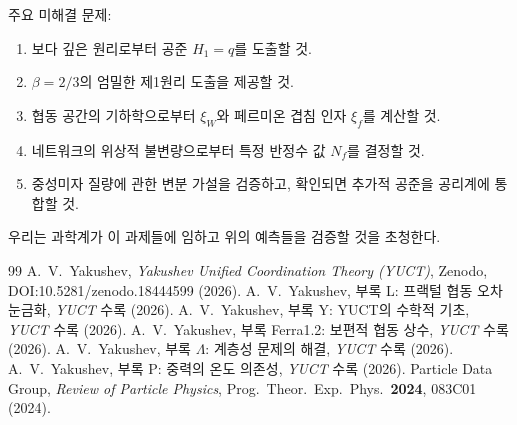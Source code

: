 \documentclass[12pt,a4paper]{article}
\begin{document}
	주요 미해결 문제:
	\begin{enumerate}[label=(\roman*)]
		\item 보다 깊은 원리로부터 공준 \(H_1 = q\)를 도출할 것.
		\item \(\beta = 2/3\)의 엄밀한 제1원리 도출을 제공할 것.
		\item 협동 공간의 기하학으로부터 \(\xi_W\)와 페르미온 겹침 인자 \(\xi_f\)를 계산할 것.
		\item 네트워크의 위상적 불변량으로부터 특정 반정수 값 \(N_f\)를 결정할 것.
		\item 중성미자 질량에 관한 변분 가설을 검증하고, 확인되면 추가적 공준을 공리계에 통합할 것.
	\end{enumerate}
	우리는 과학계가 이 과제들에 임하고 위의 예측들을 검증할 것을 초청한다.
	
	\begin{thebibliography}{99}
		 A.~V.~Yakushev, \emph{Yakushev Unified Coordination Theory (YUCT)}, Zenodo, DOI:10.5281/zenodo.18444599 (2026).
		 A.~V.~Yakushev, 부록 L: 프랙털 협동 오차 눈금화, \emph{YUCT} 수록 (2026).
		 A.~V.~Yakushev, 부록 Y: YUCT의 수학적 기초, \emph{YUCT} 수록 (2026).
		 A.~V.~Yakushev, 부록 Ferra1.2: 보편적 협동 상수, \emph{YUCT} 수록 (2026).
		 A.~V.~Yakushev, 부록 \(\Lambda\): 계층성 문제의 해결, \emph{YUCT} 수록 (2026).
		 A.~V.~Yakushev, 부록 P: 중력의 온도 의존성, \emph{YUCT} 수록 (2026).
		 Particle Data Group, \emph{Review of Particle Physics}, Prog.\ Theor.\ Exp.\ Phys.\ \textbf{2024}, 083C01 (2024).
	\end{thebibliography}
	
\end{document}
